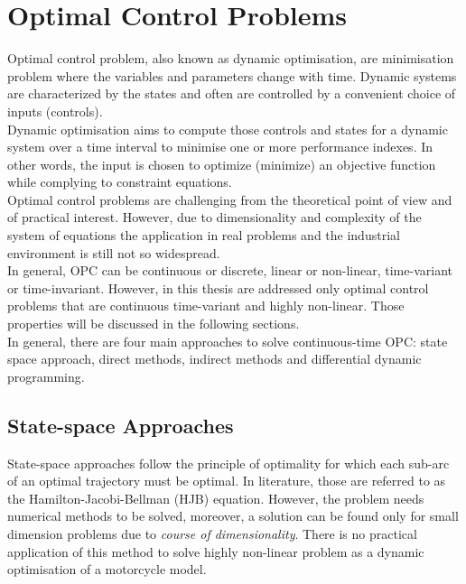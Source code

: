 \section{Optimal Control Problems}
%
Optimal control problem, also known as dynamic optimisation, are minimisation problem where the variables and parameters change with time. Dynamic systems are characterized by the states and often are controlled by a convenient choice of inputs (controls).\\
Dynamic optimisation aims to compute those controls and states for a dynamic system over a time interval to minimise one or more performance indexes. In other words, the input is chosen to optimize (minimize) an objective function while complying to constraint equations.\\
Optimal control problems are challenging from the theoretical point of view and of practical interest. However, due to dimensionality and complexity of the system of equations the application in real problems and the industrial environment is still not so widespread.\\
In general, OPC can be continuous or discrete, linear or non-linear, time-variant or time-invariant. However, in this thesis are addressed only optimal control problems that are continuous time-variant and highly non-linear. Those properties will be discussed in the following sections.\\
In general, there are four main approaches to solve continuous-time OPC: state space approach, direct methods, indirect methods and differential dynamic programming.
%
\subsection{State-space Approaches}
%
State-space approaches follow the principle of optimality for which each sub-arc of an optimal trajectory must be optimal. In literature, those are referred to as the Hamilton-Jacobi-Bellman (HJB) equation. However, the problem needs numerical methods to be solved, moreover, a solution can be found only for small dimension problems due to \textit{course of dimensionality}. There is no practical application of this method to solve highly non-linear problem as a dynamic optimisation of a motorcycle model.
%
